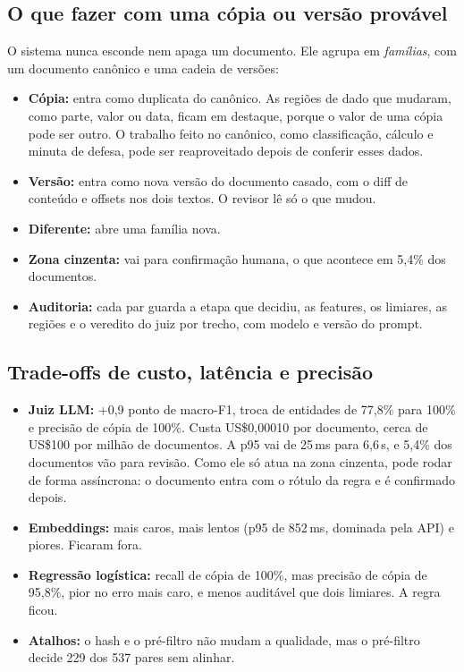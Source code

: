 \documentclass[11pt,a4paper]{article}
\begin{document}
\subsection{O que fazer com uma cópia ou versão provável}\label{sec:q1-acao}
O sistema nunca esconde nem apaga um documento. Ele agrupa em \emph{famílias}, com um documento
canônico e uma cadeia de versões:
\begin{itemize}
  \item \textbf{Cópia:} entra como duplicata do canônico. As regiões de dado que mudaram, como
    parte, valor ou data, ficam em destaque, porque o valor de uma cópia pode ser outro. O
    trabalho feito no canônico, como classificação, cálculo e minuta de defesa, pode ser
    reaproveitado depois de conferir esses dados.
  \item \textbf{Versão:} entra como nova versão do documento casado, com o diff de conteúdo e
    offsets nos dois textos. O revisor lê só o que mudou.
  \item \textbf{Diferente:} abre uma família nova.
  \item \textbf{Zona cinzenta:} vai para confirmação humana, o que acontece em 5,4\% dos documentos.
  \item \textbf{Auditoria:} cada par guarda a etapa que decidiu, as features, os limiares, as
    regiões e o veredito do juiz por trecho, com modelo e versão do prompt.
\end{itemize}

\subsection{Trade-offs de custo, latência e precisão}\label{sec:q1-tradeoffs}
\begin{itemize}
  \item \textbf{Juiz LLM:} +0,9 ponto de macro-F1, troca de entidades de 77,8\% para 100\% e
    precisão de cópia de 100\%. Custa US\$0,00010 por documento, cerca de US\$100 por milhão de
    documentos. A p95 vai de 25\,ms para 6,6\,s, e 5,4\% dos documentos vão para revisão. Como ele
    só atua na zona cinzenta, pode rodar de forma assíncrona: o documento entra com o rótulo da
    regra e é confirmado depois.
  \item \textbf{Embeddings:} mais caros, mais lentos (p95 de 852\,ms, dominada pela API) e
    piores. Ficaram fora.
  \item \textbf{Regressão logística:} recall de cópia de 100\%, mas precisão de cópia de 95,8\%,
    pior no erro mais caro, e menos auditável que dois limiares. A regra ficou.
  \item \textbf{Atalhos:} o hash e o pré-filtro não mudam a qualidade, mas o pré-filtro decide
    229 dos 537 pares sem alinhar.
\end{itemize}
\end{document}
